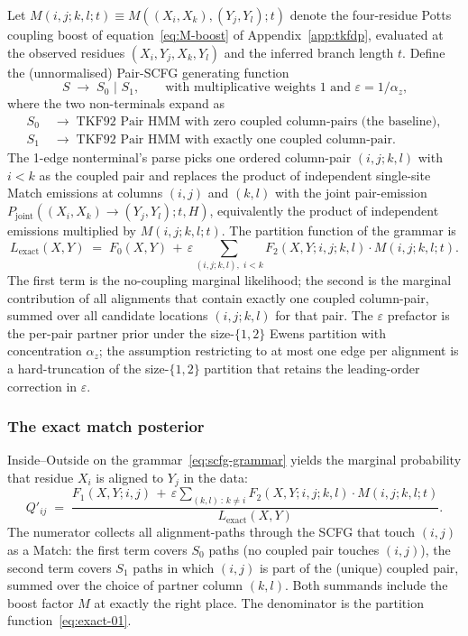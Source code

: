 Let $M(i, j; k, l; t) \equiv M((X_i, X_k), (Y_j, Y_l); t)$ denote
the four-residue Potts coupling boost of
equation~\ref{eq:M-boost} of Appendix~\ref{app:tkfdp}, evaluated
at the observed residues $(X_i, Y_j, X_k, Y_l)$ and the inferred
branch length $t$. Define the (unnormalised) Pair-SCFG generating
function
\begin{equation}
\label{eq:scfg-grammar}
S \;\to\; S_0 \,\,\big|\,\, S_1, \qquad \text{with multiplicative weights $1$ and $\varepsilon = 1 / \alpha_z$,}
\end{equation}
where the two non-terminals expand as
\begin{align*}
S_0 \;&\to\; \text{TKF92 Pair HMM with zero coupled column-pairs (the baseline)}, \\
S_1 \;&\to\; \text{TKF92 Pair HMM with exactly one coupled column-pair}.
\end{align*}
The 1-edge nonterminal's parse picks one ordered column-pair
$(i, j; k, l)$ with $i < k$ as the coupled pair and replaces the
product of independent single-site Match emissions at columns
$(i, j)$ and $(k, l)$ with the joint pair-emission
$P_{\mathrm{joint}}((X_i, X_k) \to (Y_j, Y_l); t, H)$, equivalently
the product of independent emissions multiplied by
$M(i, j; k, l; t)$. The partition function of the grammar is
\begin{equation}
\label{eq:exact-01}
L_{\mathrm{exact}}(X, Y) \;=\; F_0(X, Y) \,+\, \varepsilon \sum_{(i, j; k, l), \,\, i < k} F_2(X, Y; i, j; k, l) \cdot M(i, j; k, l; t).
\end{equation}
The first term is the no-coupling marginal likelihood; the second
is the marginal contribution of all alignments that contain
exactly one coupled column-pair, summed over all candidate
locations $(i, j; k, l)$ for that pair. The $\varepsilon$ prefactor
is the per-pair partner prior under the size-$\{1, 2\}$ Ewens
partition with concentration $\alpha_z$; the assumption restricting
to at most one edge per alignment is a hard-truncation of the
size-$\{1, 2\}$ partition that retains the leading-order correction
in $\varepsilon$.

\subsubsection*{The exact match posterior}

Inside--Outside on the grammar~\eqref{eq:scfg-grammar} yields the
marginal probability that residue $X_i$ is aligned to $Y_j$ in the
data:
\begin{equation}
\label{eq:exact-Q}
Q'_{ij} \;=\; \frac{F_1(X, Y; i, j) \,+\, \varepsilon \sum_{(k, l) \,:\, k \neq i} F_2(X, Y; i, j; k, l) \cdot M(i, j; k, l; t)}{L_{\mathrm{exact}}(X, Y)}.
\end{equation}
The numerator collects all alignment-paths through the SCFG that
touch $(i, j)$ as a Match: the first term covers $S_0$ paths (no
coupled pair touches $(i, j)$), the second term covers $S_1$ paths
in which $(i, j)$ is part of the (unique) coupled pair, summed
over the choice of partner column $(k, l)$. Both summands include
the boost factor $M$ at exactly the right place. The denominator
is the partition function~\eqref{eq:exact-01}.

